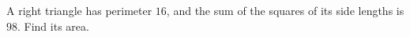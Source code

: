 A right triangle has perimeter $16$, and the sum of the squares of its side lengths is $98$. Find its area.
